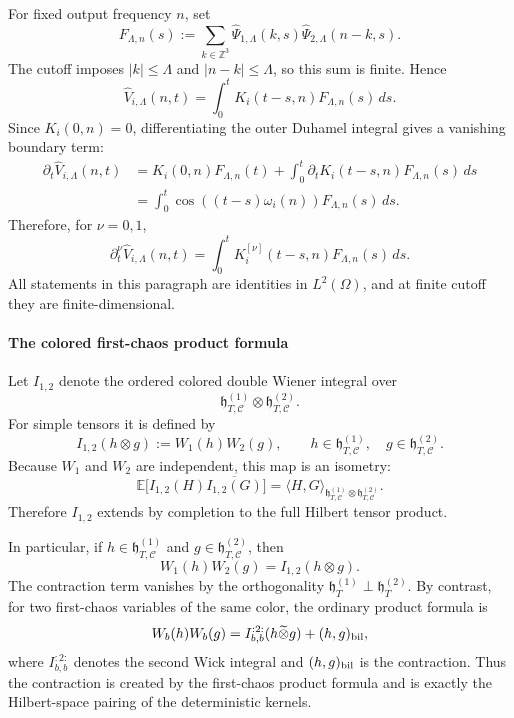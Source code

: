 \documentclass[10pt]{amsart}
\numberwithin{equation}{section}
\theoremstyle{plain}
\theoremstyle{definition}
\theoremstyle{remark}
\newcommand{\Z}{\mathbb{Z}}
\newcommand{\E}{\mathbb{E}}
\newcommand{\C}{\mathcal{C}}
\newcommand{\la}{\langle}
\newcommand{\ra}{\rangle}
\begin{document}
For fixed output frequency \(n\), set
\[
        F_{\Lambda,n}(s)
        :=
        \sum_{k\in\Z^3}
        \widehat\Psi_{1,\Lambda}(k,s)\widehat\Psi_{2,\Lambda}(n-k,s).
\]
The cutoff imposes \(|k|\le\Lambda\) and \(|n-k|\le\Lambda\), so this sum is finite.  Hence
\[
        \widehat V_{i,\Lambda}(n,t)
        =
        \int_0^t K_i(t-s,n)F_{\Lambda,n}(s)\,ds.
\]
Since \(K_i(0,n)=0\), differentiating the outer Duhamel integral gives a vanishing boundary term:
\[
\begin{aligned}
        \partial_t\widehat V_{i,\Lambda}(n,t)
        &=K_i(0,n)F_{\Lambda,n}(t)
        +\int_0^t\partial_tK_i(t-s,n)F_{\Lambda,n}(s)\,ds \\
        &=\int_0^t\cos((t-s)\omega_i(n))F_{\Lambda,n}(s)\,ds.
\end{aligned}
\]
Therefore, for \(\nu=0,1\),
\begin{equation}\label{B:Duhamel-nu-finite}
        \partial_t^\nu\widehat V_{i,\Lambda}(n,t)
        =
        \int_0^tK_i^{[\nu]}(t-s,n)F_{\Lambda,n}(s)\,ds.
\end{equation}
All statements in this paragraph are identities in \(L^2(\Omega)\), and at finite cutoff they are finite-dimensional.

\paragraph{The colored first-chaos product formula}

Let \(I_{1,2}\) denote the ordered colored double Wiener integral over
\[
        \mathfrak h_{T,\C}^{(1)}\otimes\mathfrak h_{T,\C}^{(2)}.
\]
For simple tensors it is defined by
\[
        I_{1,2}(h\otimes g):=W_1(h)W_2(g),
        \qquad
        h\in\mathfrak h_{T,\C}^{(1)},\quad
        g\in\mathfrak h_{T,\C}^{(2)}.
\]
Because \(W_1\) and \(W_2\) are independent, this map is an isometry:
\[
        \E\bigl[I_{1,2}(H)\overline{I_{1,2}(G)}\bigr]
        =
        \la H,G\ra_{\mathfrak h_{T,\C}^{(1)}\otimes\mathfrak h_{T,\C}^{(2)}}.
\]
Therefore \(I_{1,2}\) extends by completion to the full Hilbert tensor product.

In particular, if \(h\in\mathfrak h_{T,\C}^{(1)}\) and \(g\in\mathfrak h_{T,\C}^{(2)}\), then
\[
        W_1(h)W_2(g)=I_{1,2}(h\otimes g).
\]
The contraction term vanishes by the orthogonality \(\mathfrak h_T^{(1)}\perp\mathfrak h_T^{(2)}\).  By contrast, for two first-chaos variables of the same color, the ordinary product formula is
\[
        W_b(h)W_b(g)
        =
        I_{b,b}^{:2:}(h\widetilde\otimes g)+(h,g)_{\rm bil},
\]
where \(I_{b,b}^{:2:}\) denotes the second Wick integral and \((h,g)_{\rm bil}\) is the contraction.  Thus the contraction is created by the first-chaos product formula and is exactly the Hilbert-space pairing of the deterministic kernels.
\end{document}
